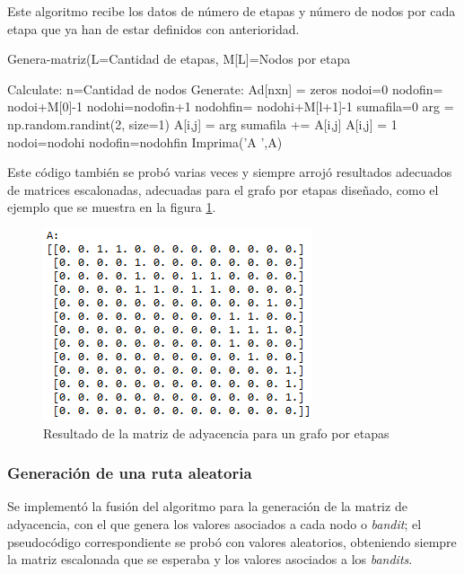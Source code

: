 Este algoritmo recibe los datos de número de etapas y número de nodos por cada etapa que ya han de estar definidos con anterioridad.

\begin{algorithm} [h]
\caption{Genera-matriz(L=Cantidad de etapas, M[L]=Nodos por etapa} 
\label{Matriz}
\begin{algorithmic}[1]
\STATE Calculate: n=Cantidad de nodos
\STATE Generate: Ad[nxn] = zeros
\STATE nodoi=0
\STATE nodofin= nodoi+M[0]-1
        \STATE nodohi=nodofin+1
        \STATE nodohfin= nodohi+M[l+1]-1
        \STATE sumafila=0
            \STATE arg = np.random.randint(2, size=1)
            \STATE A[i,j] = arg 
            \STATE sumafila += A[i,j]
                \STATE  A[i,j] = 1
            \ENDIF
        \ENDFOR
    \ENDFOR
    \STATE nodoi=nodohi
    \STATE nodofin=nodohfin
\ENDFOR     
\STATE Imprima('A ',A)
\end{algorithmic}
\end{algorithm}

Este código también se probó varias veces y siempre arrojó resultados adecuados de matrices escalonadas, adecuadas para el grafo por etapas diseñado, como el ejemplo que se muestra en la figura \ref{MatrizAy}. 

\begin{figure} [H]
    \label{Resul2}
	\centering
	\includegraphics[scale=0.8]{MatrizAy}
	\caption{Resultado de la matriz de adyacencia para un grafo por etapas}
	\label{MatrizAy}
\end{figure}

\subsubsection{Generación de una ruta aleatoria}

Se implementó la fusión del algoritmo para la generación de la matriz de adyacencia, con el que genera los valores asociados a cada nodo o \textit{bandit}; el pseudocódigo correspondiente se probó con valores aleatorios, obteniendo siempre la matriz escalonada que se esperaba y los valores asociados a los \textit{bandits}.

